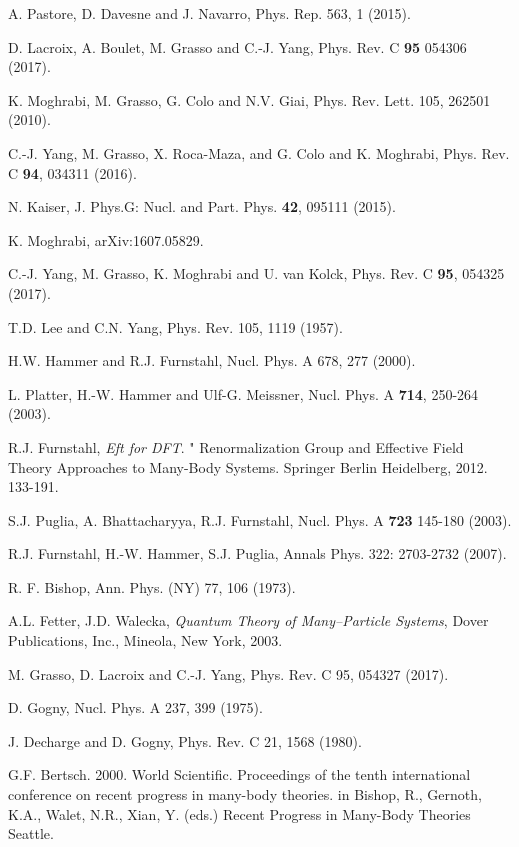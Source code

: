 \documentclass[aps,11pt,prc,preprint,superscriptaddress,nofootinbib]{revtex4}
\begin{document}
\begin{thebibliography}{99}
 A. Pastore, D. Davesne and J. Navarro, Phys. Rep. 563, 1 (2015).

 D. Lacroix, A. Boulet, M. Grasso and C.-J. Yang, Phys. Rev. C \textbf{95} 054306 (2017).

 K. Moghrabi, M. Grasso, G. Colo and N.V. Giai, Phys. Rev.
Lett. 105, 262501 (2010).

 C.-J. Yang, M. Grasso, X. Roca-Maza, and G. Colo and K.
Moghrabi, Phys. Rev. C \textbf{94}, 034311 (2016).

 N. Kaiser, J. Phys.G: Nucl. and Part. Phys. \textbf{42},
095111 (2015).

 K. Moghrabi, arXiv:1607.05829.

 C.-J. Yang, M. Grasso, K. Moghrabi and U. van Kolck, Phys. Rev. C \textbf{95}, 054325 (2017).


 T.D. Lee and C.N. Yang, Phys. Rev. 105, 1119 (1957).

 H.W. Hammer and R.J. Furnstahl, Nucl. Phys. A 678, 277
(2000).

 L. Platter, H.-W. Hammer and Ulf-G. Meissner, Nucl. Phys.
A \textbf{714}, 250-264 (2003).

 R.J. Furnstahl, \textit{Eft for DFT}. " Renormalization
Group and Effective Field Theory Approaches to Many-Body Systems. Springer
Berlin Heidelberg, 2012. 133-191.

 S.J. Puglia, A. Bhattacharyya, R.J. Furnstahl, Nucl. Phys. A \textbf{723} 145-180 (2003).

 R.J. Furnstahl, H.-W. Hammer, S.J. Puglia, Annals Phys. 322: 2703-2732 (2007).

 R. F. Bishop, Ann. Phys. (NY) 77, 106 (1973).

 A.L. Fetter, J.D. Walecka, {\it{Quantum Theory of Many--Particle Systems}}, Dover Publications, Inc., Mineola, New York, 2003. 


 M. Grasso, D. Lacroix and C.-J. Yang, Phys. Rev. C 95, 054327 (2017).

 D. Gogny, Nucl. Phys. A 237, 399 (1975).

 J. Decharge and D. Gogny, Phys. Rev. C 21, 1568 (1980).

 G.F. Bertsch. 2000. World Scientific. Proceedings of the tenth international conference on recent progress in many-body theories. in Bishop, R., Gernoth, K.A., Walet, N.R., Xian, Y. (eds.) Recent Progress in Many-Body Theories Seattle.


\end{thebibliography}
\end{document}
